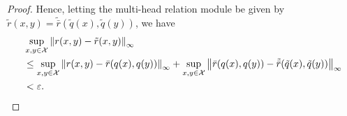 \begin{proof}
    Hence, letting the multi-head relation module be given by $\tilde{r}(x,y) = \tilde{\bar{r}}(\tilde{q}(x), \tilde{q}(y))$, we have
    \begin{align*}
        &\sup_{x, y \in {\mathcal{X}}} \left\lVert r(x,y) - \tilde{r}(x,y)\right\rVert_{\infty} \\
        &\leq \sup_{x, y \in {\mathcal{X}}} \left\lVert r(x,y) - \bar{r}(q(x), q(y))\right\rVert_{\infty} + \sup_{x, y \in {\mathcal{X}}} \left\lVert\bar{r}(q(x), q(y)) - \tilde{\bar{r}}(\tilde{q}(x), \tilde{q}(y))\right\rVert_{\infty} \\
        &< \varepsilon.
    \end{align*}


\end{proof}